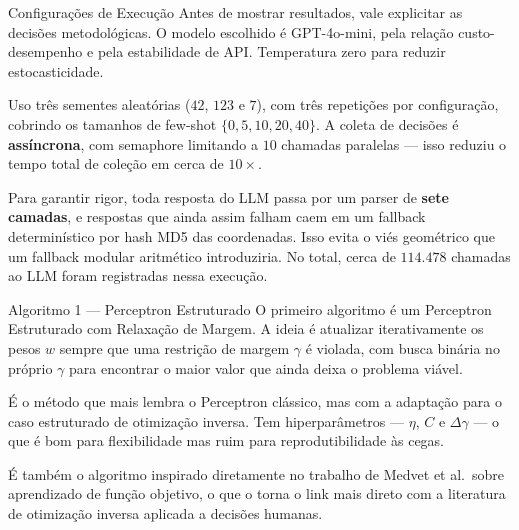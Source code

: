 \documentclass[aspectratio=169,10pt]{beamer}
\begin{document}
\begin{frame}{Configura\c{c}\~oes de Execu\c{c}\~ao}
  \small
  Antes de mostrar resultados, vale explicitar as decis\~oes metodol\'ogicas. O modelo escolhido \'e
  GPT-4o-mini, pela rela\c{c}\~ao custo-desempenho e pela estabilidade de API. Temperatura zero para
  reduzir estocasticidade.
  \medskip

  Uso tr\^es sementes aleat\'orias ($42$, $123$ e $7$), com tr\^es repeti\c{c}\~oes por configura\c{c}\~ao,
  cobrindo os tamanhos de few-shot $\{0, 5, 10, 20, 40\}$. A coleta de decis\~oes \'e \textbf{ass\'incrona},
  com semaphore limitando a $10$ chamadas paralelas --- isso reduziu o tempo total de cole\c{c}\~ao em cerca
  de $10\times$.
  \medskip

  Para garantir rigor, toda resposta do LLM passa por um parser de \textbf{sete camadas}, e respostas
  que ainda assim falham caem em um fallback determin\'istico por hash MD5 das coordenadas. Isso evita
  o vi\'es geom\'etrico que um fallback modular aritm\'etico introduziria. No total, cerca de
  $114\mbox{.}478$ chamadas ao LLM foram registradas nessa execu\c{c}\~ao.
\end{frame}

\begin{frame}{Algoritmo 1 --- Perceptron Estruturado}
  \small
  O primeiro algoritmo \'e um Perceptron Estruturado com Relaxa\c{c}\~ao de Margem. A ideia \'e atualizar
  iterativamente os pesos $w$ sempre que uma restri\c{c}\~ao de margem $\gamma$ \'e violada, com
  busca bin\'aria no pr\'oprio $\gamma$ para encontrar o maior valor que ainda deixa o problema vi\'avel.
  \medskip

  \'E o m\'etodo que mais lembra o Perceptron cl\'assico, mas com a adapta\c{c}\~ao para o caso estruturado
  de otimiza\c{c}\~ao inversa. Tem hiperpar\^ametros --- $\eta$, $C$ e $\Delta\gamma$ --- o que \'e bom
  para flexibilidade mas ruim para reprodutibilidade \`as cegas.
  \medskip

  \'E tamb\'em o algoritmo inspirado diretamente no trabalho de Medvet et al.\ sobre aprendizado de
  fun\c{c}\~ao objetivo, o que o torna o link mais direto com a literatura de otimiza\c{c}\~ao inversa
  aplicada a decis\~oes humanas.
\end{frame}
\end{document}
